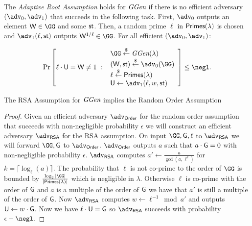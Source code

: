 \begin{assumption}
\label{assum:adaptiveroot}
The \emph{Adaptive Root Assumption} holds for $\textit{GGen}$ if 
there is no efficient adversary $(\adv_0,\adv_1)$ that succeeds 
in the following task.
First, $\adv_0$ outputs an element $\gr{w} \in \GG$ and some $\textsf{st}$.
Then, a random prime $\ell$ in $\textsf{Primes}(\lambda)$ is chosen
and $\adv_1(\ell,\state)$ outputs $\gr{w}^{1/\ell} \in \GG$.
For all efficient $(\adv_0,\adv_1)$:
\begin{small}
\[           
                \Pr\left[\ell \cdot \gr{u} = \gr{w} \neq 1 \ : \ 
                \begin{array}{l}
                      \GG \sample \ggen(\lambda) \\ 
                      (\gr{w},\state) \sample \adv_0(\GG) \\
                      \ell \sample \primes \\ 
                      \gr{u} \gets \adv_1(\ell,w, \state)
                \end{array} 
        \right] \leq \negl.
\]
\end{small}
\end{assumption}
\begin{lemma}
\label{lem:roa-to-rsa}
	The RSA Assumption for $\textit{GGen}$ implies the Random Order Assumption
	\end{lemma}
\begin{proof}
	Given an efficient adversary $\adv_{\textsf{Order}}$ for the random order assumption that succeeds with non-negligible probability $\epsilon$ we will construct an efficient adversary $\adv_{\textsf{RSA}}$ for the RSA assumption. On input $\GG,\Generator,\ell$ to $\adv_{\textsf{RSA}}$ we will forward $\GG,\Generator$ to $\adv_{\textsf{Order}}$. $\adv_{\textsf{Order}}$ outputs $a$ such that $a\cdot \Generator=0$ with non-negligible probability $\epsilon$. 
	$\adv_{\textsf{RSA}}$ computes $a'\gets \frac{a}{\gcd(a,\ell^k)}$ for $k=\lceil\log_\ell(a)\rceil$. The probability that $\ell$ is not co-prime to the order of $\GG$ is bounded by $\frac{\log_2{|\GG|}}{|\primes|}$ which is negligible in $\lambda$. Otherwise $\ell$ is co-prime with the order of $\Generator$ and $a$ is a multiple of the order of $\Generator$ we have that $a'$ is still a multiple of the order of $\Generator$. Now $\adv_{\textsf{RSA}}$ computes $w\gets \ell^{-1} \bmod a'$ and outputs $\gr{U} \gets w\cdot \Generator$. Now we have $\ell \cdot \gr{U}=\Generator$ so $\adv_{\textsf{RSA}}$ succeeds with probability $\epsilon-\negl $.
\end{proof}
